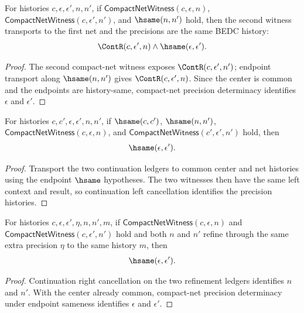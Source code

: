 \begin{theorem}
\label{thm:compact-net-witness-common-center-precision-transport}
For histories $c,\epsilon,\epsilon',n,n'$, if
$\mathsf{CompactNetWitness}(c,\epsilon,n)$,
$\mathsf{CompactNetWitness}(c,\epsilon',n')$, and $\hsame(n,n')$ hold, then
the second witness transports to the first net and the precisions are the same
BEDC history:
$$
\ContR(c,\epsilon',n)\land \hsame(\epsilon,\epsilon').
$$
\end{theorem}
\begin{proof}
The second compact-net witness exposes $\ContR(c,\epsilon',n')$; endpoint
transport along $\hsame(n,n')$ gives $\ContR(c,\epsilon',n)$. Since the center
is common and the endpoints are history-same, compact-net precision
determinacy identifies $\epsilon$ and $\epsilon'$.
\end{proof}

\begin{theorem}
\label{thm:compact-net-witness-precision-hsame-deterministic}
For histories $c,c',\epsilon,\epsilon',n,n'$, if $\hsame(c,c')$,
$\hsame(n,n')$, $\mathsf{CompactNetWitness}(c,\epsilon,n)$, and
$\mathsf{CompactNetWitness}(c',\epsilon',n')$ hold, then
$$
\hsame(\epsilon,\epsilon').
$$
\end{theorem}
\begin{proof}
Transport the two continuation ledgers to common center and net histories using
the endpoint $\hsame$ hypotheses. The two witnesses then have the same left
context and result, so continuation left cancellation identifies the precision
histories.
\end{proof}

\begin{theorem}
\label{thm:compact-net-witness-composite-precision-cont-deterministic}
For histories $c,\epsilon,\epsilon',\eta,n,n',m$, if
$\mathsf{CompactNetWitness}(c,\epsilon,n)$ and
$\mathsf{CompactNetWitness}(c,\epsilon',n')$ hold and both $n$ and $n'$ refine
through the same extra precision $\eta$ to the same history $m$, then
$$
\hsame(\epsilon,\epsilon').
$$
\end{theorem}
\begin{proof}
Continuation right cancellation on the two refinement ledgers identifies
$n$ and $n'$. With the center already common, compact-net precision
determinacy under endpoint sameness identifies $\epsilon$ and $\epsilon'$.
\end{proof}

